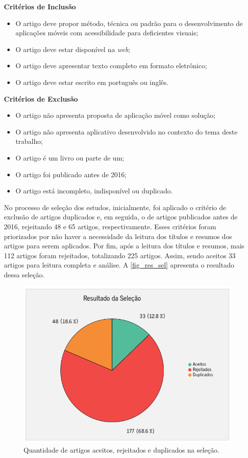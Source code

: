 \textbf{Critérios de Inclusão}
\begin{itemize}
  \item O artigo deve propor método, técnica ou padrão para o desenvolvimento de aplicações móveis com acessibilidade para deficientes visuais;
  \item O artigo deve estar disponível na \emph{web};
  \item O artigo deve apresentar texto completo em formato eletrônico;
  \item O artigo deve estar escrito em português ou inglês.
\end{itemize}

\textbf{Critérios de Exclusão}
\begin{itemize}
  \item O artigo não apresenta proposta de aplicação móvel como solução;
  \item O artigo não apresenta aplicativo desenvolvido no contexto do tema deste trabalho;
  \item O artigo é um livro ou parte de um;
  \item O artigo foi publicado antes de 2016;
  \item O artigo está incompleto, indisponível ou duplicado.
\end{itemize}

No processo de seleção dos estudos, inicialmente, foi aplicado o critério de exclusão de artigos duplicados e, em seguida, o de artigos publicados antes de 2016, rejeitando 48 e 65 artigos, respectivamente.
Esses critérios foram priorizados por não haver a necessidade da leitura dos títulos e resumos dos artigos para serem aplicados.
Por fim, após a leitura dos títulos e resumos, mais 112 artigos foram rejeitados, totalizando 225 artigos.
Assim, sendo aceitos 33 artigos para leitura completa e análise.
A \autoref{fig_res_sel} apresenta o resultado dessa seleção.

\begin{figure}[htb]
	\caption{\label{fig_res_sel}Quantidade de artigos aceitos, rejeitados e duplicados na seleção.}
	\begin{center}
	    \includegraphics[scale=0.7]{Imagens/msl/resultado_selecao.png}
	\end{center}
\end{figure}

